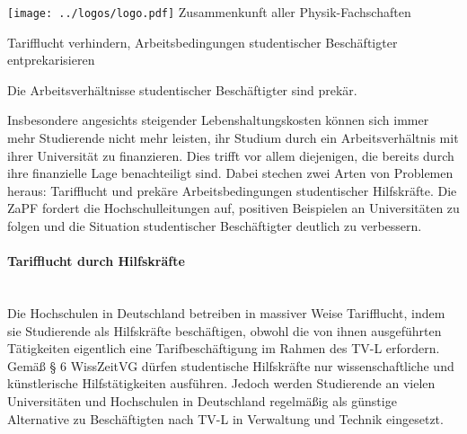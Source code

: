\documentclass[DIV=calc]{scrartcl}
\begin{document}
\hspace{0.87\textwidth}
\begin{minipage}{120pt}
	\vspace{-1.8cm}
	\texttt{[image: ../logos/logo.pdf]}
	\centering
	\small Zusammenkunft aller Physik-Fachschaften
\end{minipage}

\begin{center}
  \huge{Tarifflucht verhindern, Arbeitsbedingungen studentischer Beschäftigter entprekarisieren}\vspace{.25\baselineskip}\\
  \normalsize
\end{center}
\vspace{1cm}







Die Arbeitsverhältnisse studentischer Beschäftigter sind prekär. 

Insbesondere angesichts steigender Lebenshaltungskosten können sich immer mehr Studierende nicht mehr leisten, ihr Studium durch ein Arbeitsverhältnis mit ihrer Universität zu finanzieren. Dies trifft vor allem diejenigen, die bereits durch ihre finanzielle Lage benachteiligt sind. Dabei stechen zwei Arten von Problemen heraus: Tarifflucht und prekäre Arbeitsbedingungen studentischer Hilfskräfte. Die ZaPF fordert die Hochschulleitungen auf, positiven Beispielen an Universitäten zu folgen und die Situation studentischer Beschäftigter deutlich zu verbessern.

\paragraph{Tarifflucht durch Hilfskräfte} \mbox{}\\
Die Hochschulen in Deutschland betreiben in massiver Weise Tarifflucht, indem sie Studierende als Hilfskräfte beschäftigen, obwohl die von ihnen ausgeführten Tätigkeiten eigentlich eine Tarifbeschäftigung im Rahmen des TV-L erfordern. Gemäß § 6 WissZeitVG dürfen studentische Hilfskräfte nur wissenschaftliche und künstlerische Hilfstätigkeiten ausführen. Jedoch werden Studierende an vielen Universitäten und Hochschulen in Deutschland regelmäßig als günstige Alternative zu Beschäftigten nach TV-L in Verwaltung und Technik eingesetzt. 
\end{document}
